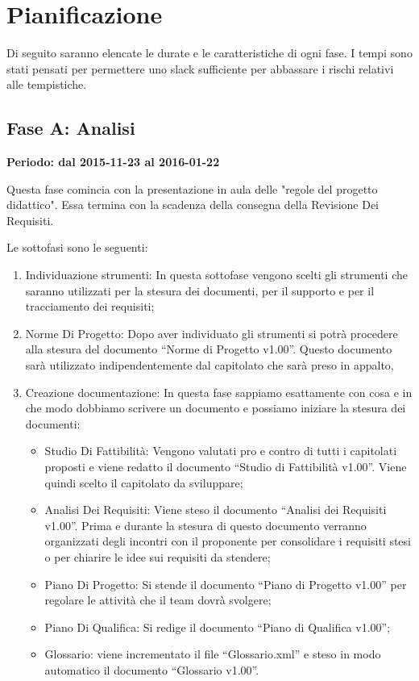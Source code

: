 \documentclass[../PianoProgetto.tex]{subfiles}
\begin{document}
\section{Pianificazione}

	Di seguito saranno elencate le durate e le caratteristiche di ogni fase. I tempi sono stati pensati per permettere uno slack sufficiente per abbassare i rischi relativi alle tempistiche.
	
	\subsection{Fase A: Analisi}
	
	\textbf{Periodo: dal 2015-11-23 al 2016-01-22}

	Questa fase comincia con la presentazione in aula delle "regole del progetto didattico". Essa termina con la scadenza della consegna della Revisione Dei Requisiti.

	Le sottofasi sono le seguenti:
	\begin{enumerate}
		\item Individuazione strumenti: In questa sottofase vengono scelti gli strumenti che saranno utilizzati per la stesura dei documenti, per il supporto e per il tracciamento dei requisiti;
		\item Norme Di Progetto: Dopo aver individuato gli strumenti si potrà procedere alla stesura del documento “Norme di Progetto v1.00”. Questo documento sarà utilizzato indipendentemente dal capitolato che sarà preso in appalto,
		\item Creazione documentazione: In questa fase sappiamo esattamente con cosa e in che modo dobbiamo scrivere un documento e possiamo iniziare la stesura dei documenti:
		\begin{itemize}
		\item Studio Di Fattibilità: Vengono valutati pro e contro di tutti i capitolati proposti e viene redatto il documento “Studio di Fattibilità v1.00”. Viene quindi scelto il capitolato da sviluppare;
		\item Analisi Dei Requisiti: Viene steso il documento “Analisi dei Requisiti v1.00”. Prima e durante la stesura di questo documento verranno organizzati degli incontri con il proponente per consolidare i requisiti stesi o per chiarire le idee sui requisiti da stendere;
		\item Piano Di Progetto: Si stende il documento “Piano di Progetto v1.00” per regolare le attività che il team dovrà svolgere;
		\item Piano Di Qualifica: Si redige il documento “Piano di Qualifica v1.00”;
		\item Glossario: viene incrementato il file “Glossario.xml” e steso in modo automatico il documento “Glossario v1.00”.
		\end{itemize}
	\end{enumerate}
		
\end{document}
